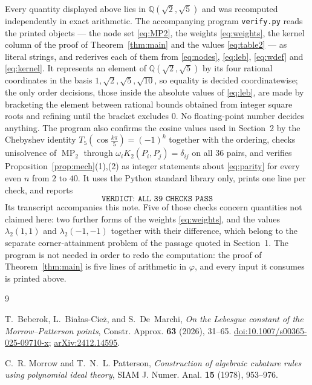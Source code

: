 \documentclass[11pt]{amsart}
\DeclareMathOperator{\MP}{MP}
\newcommand{\ph}{\varphi}
\begin{document}
Every quantity displayed above lies in $\mathbb Q(\sqrt2,\sqrt5)$ and was
recomputed independently in exact arithmetic. The accompanying program
\texttt{verify.py} reads the printed objects --- the node set \eqref{eq:MP2},
the weights \eqref{eq:weights}, the kernel column of the proof of
Theorem~\ref{thm:main} and the values \eqref{eq:table2} --- as literal strings,
and rederives each of them from \eqref{eq:nodes}, \eqref{eq:leb},
\eqref{eq:wdef} and \eqref{eq:kernel}. It represents an element of
$\mathbb Q(\sqrt2,\sqrt5)$ by its four rational coordinates in the basis
$1,\sqrt2,\sqrt5,\sqrt{10}$, so equality is decided coordinatewise; the only
order decisions, those inside the absolute values of \eqref{eq:leb}, are made by
bracketing the element between rational bounds obtained from integer square
roots and refining until the bracket excludes $0$. No floating-point number
decides anything. The program also confirms the cosine values used in
Section~2 by the Chebyshev identity $T_5(\cos\frac{k\pi}5)=(-1)^k$ together with
the ordering, checks unisolvence of $\MP_2$ through
$\omega_iK_2(P_i,P_j)=\delta_{ij}$ on all $36$ pairs, and verifies
Proposition~\ref{prop:mech}(1),(2) as integer statements about
\eqref{eq:parity} for every even $n$ from $2$ to $40$. It uses the Python
standard library only, prints one line per check, and reports
\[
  \texttt{VERDICT: ALL 39 CHECKS PASS}
\]
Its transcript accompanies this note. Five of those checks concern quantities
not claimed here: two further forms of the weights \eqref{eq:weights}, and the
values $\lambda_2(1,1)$ and $\lambda_2(-1,-1)$ together with their difference,
which belong to the separate corner-attainment problem of the passage quoted in
Section~1. The program is not needed in order to redo the computation: the proof
of Theorem~\ref{thm:main} is five lines of arithmetic in $\ph$, and every input
it consumes is printed above.

\begin{thebibliography}{9}

T.~Beberok, L.~Bia\l as-Cie\.z, and S.~De~Marchi,
\emph{On the Lebesgue constant of the Morrow--Patterson points},
Constr. Approx. \textbf{63} (2026), 31--65.
\href{https://doi.org/10.1007/s00365-025-09710-x}{doi:10.1007/s00365-025-09710-x};
\href{https://arxiv.org/abs/2412.14595}{arXiv:2412.14595}.

C.~R. Morrow and T.~N.~L. Patterson,
\emph{Construction of algebraic cubature rules using polynomial ideal theory},
SIAM J. Numer. Anal. \textbf{15} (1978), 953--976.

\end{thebibliography}
\end{document}
